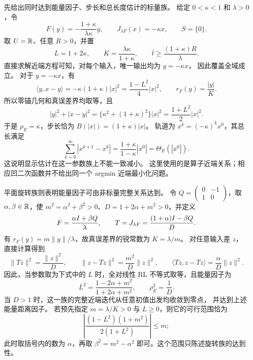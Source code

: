 先给出同时达到能量因子、步长和总长度估计的标量族。
给定 $0<\kappa<1$ 和 $\lambda>0$，令
\begin{equation}
\label{eq:scalar-sharp-family}
 F(y)=-\frac{1+\kappa}{\lambda\kappa}y,\qquad
 J_{\lambda F}(x)=-\kappa x,\qquad S=\{0\}.
\end{equation}
取 $U=\mathbb R$、任意 $R>0$，并置
\[
 L=1+2\kappa,\qquad K=\frac{\lambda\kappa}{1+\kappa},
 \qquad \bar t\ge\frac{(1+\kappa)R}\lambda.
\]
直接求解近端方程可知，对每个输入，唯一输出均为 $y=-\kappa x$，
因此覆盖全域成立。
对于 $y=-\kappa x$，有
\[
 \langle y,x-y\rangle=-\kappa(1+\kappa)|x|^2
 =\frac{1-L^2}{4}|x|^2,
 \qquad r_F(y)=\frac{|y|}{K}.
\]
所以零锚几何和真误差界均取等，且
\[
 |y|^2+|x-y|^2
 =\{\kappa^2+(1+\kappa)^2\}|x|^2
 =\frac{1+L^2}{2}|x|^2.
\]
于是 $\rho_E=\kappa$，步长恰为 $B(|x|)=(1+\kappa)|x|$。
轨道为 $x^k=(-\kappa)^kx^0$，其总长满足
\begin{equation}
\label{eq:scalar-sharp-length}
 \sum_{k=0}^{\infty}|x^{k+1}-x^k|
 =\frac{1+\kappa}{1-\kappa}|x^0|=\Theta_E(|x^0|).
\end{equation}
这说明显示估计在这一参数族上不能一致减小。
这里使用的是算子近端关系；相应凹二次函数并不给出同一个 argmin 近端最小化问题。

平面旋转族则表明能量因子可由非标量完整关系达到。
令 $Q=\begin{pmatrix}0&-1\\1&0\end{pmatrix}$，取
$\alpha,\beta\in\mathbb R$，使
$m^2=\alpha^2+\beta^2>0$、$D=1+2\alpha+m^2>0$，并定义
\begin{equation}
\label{eq:rotation-sharp-family}
 F=\frac{\alpha I+\beta Q}{\lambda},\qquad
 T=J_{\lambda F}=\frac{(1+\alpha)I-\beta Q}{D}.
\end{equation}
有 $r_F(y)=m\|y\|/\lambda$，故真误差界的锐常数为 $K=\lambda/m$。
对任意输入差 $z$，直接计算得到
\[
 \|Tz\|^2=\frac{\|z\|^2}{D},\qquad
 \|z-Tz\|^2=\frac{m^2}{D}\|z\|^2,
 \qquad
 \langle Tz,z-Tz\rangle=\frac{\alpha}{D}\|z\|^2.
\]
因此，当参数取为下式中的 $L$ 时，全对线性 RL 不等式取等，且能量因子为
\begin{equation}
\label{eq:rotation-sharp-parameters}
 L^2=\frac{1-2\alpha+m^2}{1+2\alpha+m^2},
 \qquad \rho_E^2=\frac1D.
\end{equation}
当 $D>1$ 时，这一族的完整近端迭代从任意初值出发均收敛到零点，
并达到上述能量距离因子。
若预先指定 $m=\lambda/K>0$ 与 $L\ge0$，则它的可行范围恰为
\begin{equation}
\label{eq:rotation-feasible-range}
 \left|\frac{(1-L^2)(1+m^2)}{2(1+L^2)}\right|\le m;
\end{equation}
此时取括号内的数为 $\alpha$，再取
$\beta^2=m^2-\alpha^2$ 即可。这个范围只陈述旋转族的达到性。

